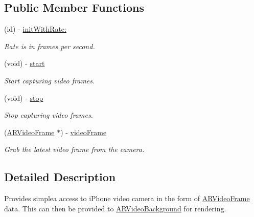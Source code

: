 \subsection*{\-Public \-Member \-Functions}
\begin{DoxyCompactItemize}
\item 
\hypertarget{interface_a_r_video_frame_controller_a94f7769c58f9202da3eeab9b452df4ad}{
(id) -\/ \hyperlink{interface_a_r_video_frame_controller_a94f7769c58f9202da3eeab9b452df4ad}{init\-With\-Rate\-:}}
\label{interface_a_r_video_frame_controller_a94f7769c58f9202da3eeab9b452df4ad}

\begin{DoxyCompactList}\small\item\em \-Rate is in frames per second. \end{DoxyCompactList}\item 
\hypertarget{interface_a_r_video_frame_controller_a6ee104be0e287fea2f8beed4f4e97cf6}{
(void) -\/ \hyperlink{interface_a_r_video_frame_controller_a6ee104be0e287fea2f8beed4f4e97cf6}{start}}
\label{interface_a_r_video_frame_controller_a6ee104be0e287fea2f8beed4f4e97cf6}

\begin{DoxyCompactList}\small\item\em \-Start capturing video frames. \end{DoxyCompactList}\item 
\hypertarget{interface_a_r_video_frame_controller_a509702d9d3e1fa9932bb304ea3f509fb}{
(void) -\/ \hyperlink{interface_a_r_video_frame_controller_a509702d9d3e1fa9932bb304ea3f509fb}{stop}}
\label{interface_a_r_video_frame_controller_a509702d9d3e1fa9932bb304ea3f509fb}

\begin{DoxyCompactList}\small\item\em \-Stop capturing video frames. \end{DoxyCompactList}\item 
(\hyperlink{struct_a_r_video_frame}{\-A\-R\-Video\-Frame} $\ast$) -\/ \hyperlink{interface_a_r_video_frame_controller_acc064912b45b3e81fcbc8b21d2953e29}{video\-Frame}
\begin{DoxyCompactList}\small\item\em \-Grab the latest video frame from the camera. \end{DoxyCompactList}\end{DoxyCompactItemize}


\subsection{\-Detailed \-Description}
\-Provides simplea access to i\-Phone video camera in the form of \hyperlink{struct_a_r_video_frame}{\-A\-R\-Video\-Frame} data. \-This can then be provided to \hyperlink{interface_a_r_video_background}{\-A\-R\-Video\-Background} for rendering. 

